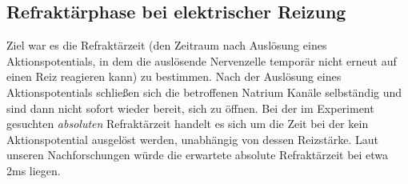 \documentclass[a4paper]{article}
\begin{document}
\subsection{Refraktärphase bei elektrischer Reizung}
Ziel war es die Refraktärzeit (den Zeitraum nach Auslösung eines Aktionspotentials, in dem die auslösende Nervenzelle temporär nicht erneut auf einen Reiz reagieren kann) zu bestimmen. Nach der Auslösung eines Aktionspotentials schließen sich die betroffenen Natrium Kanäle selbständig und sind dann nicht sofort wieder bereit, sich zu öffnen. Bei der im Experiment gesuchten \textit{absoluten} Refraktärzeit handelt es sich um die Zeit bei der kein Aktionspotential ausgelöst werden, unabhängig von dessen Reizstärke. Laut unseren Nachforschungen würde die erwartete absolute Refraktärzeit bei etwa 2ms liegen.

\printbibliography
\end{document}
